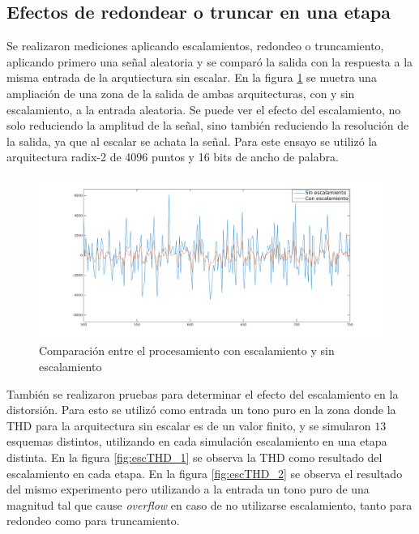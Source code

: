 \subsection{Efectos de redondear o truncar en una etapa}

Se realizaron mediciones aplicando escalamientos, redondeo o truncamiento, aplicando primero una
señal aleatoria y se comparó la salida con la respuesta a la misma entrada de la arqutiectura sin
escalar. En la figura \ref{fig:trunnotrunc} se muetra una ampliación de una zona de la salida de
ambas arquitecturas, con y sin escalamiento, a la entrada aleatoria. Se puede ver el efecto del
escalamiento, no solo reduciendo la amplitud de la señal, sino también reduciendo la resolución de
la salida, ya que al escalar se achata la señal. Para este ensayo se utilizó la arquitectura
radix-2 de 4096 puntos y 16 bits de ancho de palabra.

\begin{figure}[htb!]
        \advance\leftskip-1.5cm
        \includegraphics[width=16cm]{./figures/r2_4096_16_mul_esc_comp.png}
        \caption{Comparación entre el procesamiento con escalamiento y sin escalamiento}
        \label{fig:trunnotrunc}
\end{figure}

También se realizaron pruebas para determinar el efecto del escalamiento en la distorsión. Para esto
se utilizó como entrada un tono puro en la zona donde la THD para la arquitectura sin escalar es de
un valor finito, y se simularon $13$ esquemas distintos, utilizando en cada simulación escalamiento
en una etapa distinta. En la figura \ref{fig:escTHD_1} se observa la THD como resultado del escalamiento en
cada etapa. En la figura \ref{fig:escTHD_2} se
observa el resultado del mismo experimento pero utilizando a la entrada un tono puro de una magnitud
tal que cause \textit{overflow} en caso de no utilizarse escalamiento, tanto para redondeo como
para truncamiento.

